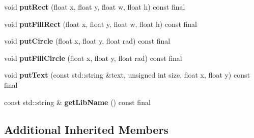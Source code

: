 \begin{DoxyCompactItemize}
\item 
\mbox{\label{classArcade_1_1Display_1_1SDL_a81a7dc1e2ec20a453ca12d24b079968e}} 
void {\bfseries put\+Rect} (float x, float y, float w, float h) const final
\item 
\mbox{\label{classArcade_1_1Display_1_1SDL_a83252dfdf7260a64e6c1bad921c6a2fa}} 
void {\bfseries put\+Fill\+Rect} (float x, float y, float w, float h) const final
\item 
\mbox{\label{classArcade_1_1Display_1_1SDL_af289c27eb970e81918b4cca36f25e0cf}} 
void {\bfseries put\+Circle} (float x, float y, float rad) const final
\item 
\mbox{\label{classArcade_1_1Display_1_1SDL_a95422e57b7ce4222f7e8d4aa022f36b4}} 
void {\bfseries put\+Fill\+Circle} (float x, float y, float rad) const final
\item 
\mbox{\label{classArcade_1_1Display_1_1SDL_aa3bd454c083beb16300bb799ed268ef7}} 
void {\bfseries put\+Text} (const std\+::string \&text, unsigned int size, float x, float y) const final
\item 
\mbox{\label{classArcade_1_1Display_1_1SDL_aa549d6ec470b99b545db63a1d4a2b58e}} 
const std\+::string \& {\bfseries get\+Lib\+Name} () const final
\end{DoxyCompactItemize}
\subsection*{Additional Inherited Members}
